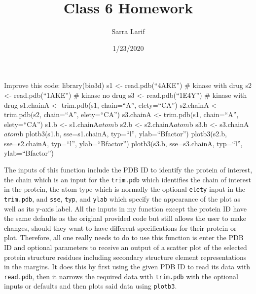 \documentclass[
]{article}
\title{Class 6 Homework}
\author{Sarra Larif}
\date{1/23/2020}
\newenvironment{Shaded}{\begin{snugshade}}{\end{snugshade}}
\newcommand{\ControlFlowTok}[1]{\textcolor[rgb]{0.13,0.29,0.53}{\textbf{#1}}}
\newcommand{\DataTypeTok}[1]{\textcolor[rgb]{0.13,0.29,0.53}{#1}}
\newcommand{\KeywordTok}[1]{\textcolor[rgb]{0.13,0.29,0.53}{\textbf{#1}}}
\newcommand{\NormalTok}[1]{#1}
\newcommand{\OperatorTok}[1]{\textcolor[rgb]{0.81,0.36,0.00}{\textbf{#1}}}
\newcommand{\StringTok}[1]{\textcolor[rgb]{0.31,0.60,0.02}{#1}}
\begin{document}
\maketitle

Improve this code: library(bio3d) s1 \textless- read.pdb(``4AKE'') \#
kinase with drug s2 \textless- read.pdb(``1AKE'') \# kinase no drug s3
\textless- read.pdb(``1E4Y'') \# kinase with drug s1.chainA \textless-
trim.pdb(s1, chain=``A'', elety=``CA'') s2.chainA \textless-
trim.pdb(s2, chain=``A'', elety=``CA'') s3.chainA \textless-
trim.pdb(s1, chain=``A'', elety=``CA'') s1.b \textless-
s1.chainA\(atom\)b s2.b \textless- s2.chainA\(atom\)b s3.b \textless-
s3.chainA\(atom\)b plotb3(s1.b, sse=s1.chainA, typ=``l'',
ylab=``Bfactor'') plotb3(s2.b, sse=s2.chainA, typ=``l'',
ylab=``Bfactor'') plotb3(s3.b, sse=s3.chainA, typ=``l'',
ylab=``Bfactor'')

\begin{Shaded}
\end{Shaded}

The inputs of this function include the PDB ID to identify the protein
of interest, the chain which is an input for the \texttt{trim.pdb} which
identifies the chain of interest in the protein, the atom type which is
normally the optional \texttt{elety} input in the \texttt{trim.pdb}, and
\texttt{sse}, \texttt{typ}, and \texttt{ylab} which specify the
appearance of the plot as well as its y-axis label. All the inputs in my
function except the protein ID have the same defaults as the original
provided code but still allows the user to make changes, should they
want to have different specifications for their protein or plot.
Therefore, all one really needs to do to use this function is enter the
PDB ID and optional parameters to receive an output of a scatter plot of
the selected protein structure residues including secondary structure
element representations in the margins. It does this by first using the
given PDB ID to read its data with \texttt{read.pdb}, then it narrows
the required data with \texttt{trim.pdb} with the optional inputs or
defaults and then plots said data using \texttt{plotb3}.
\end{document}
